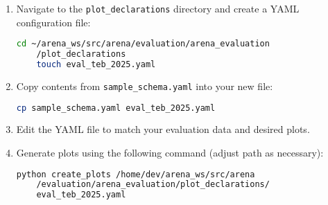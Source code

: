 \begin{enumerate}
  \item Navigate to the \texttt{plot\_declarations} directory and create a YAML configuration file:

  \begin{lstlisting}[language=bash]
    cd ~/arena_ws/src/arena/evaluation/arena_evaluation
    /plot_declarations
    touch eval_teb_2025.yaml
  \end{lstlisting}

  \item Copy contents from \texttt{sample\_schema.yaml} into your new file:

  \begin{lstlisting}[language=bash]
    cp sample_schema.yaml eval_teb_2025.yaml
  \end{lstlisting}

  \item Edit the YAML file to match your evaluation data and desired plots.

  \item Generate plots using the following command (adjust path as necessary):

  \begin{lstlisting}[language=bash]
    python create_plots /home/dev/arena_ws/src/arena
    /evaluation/arena_evaluation/plot_declarations/
    eval_teb_2025.yaml
  \end{lstlisting}
\end{enumerate}
